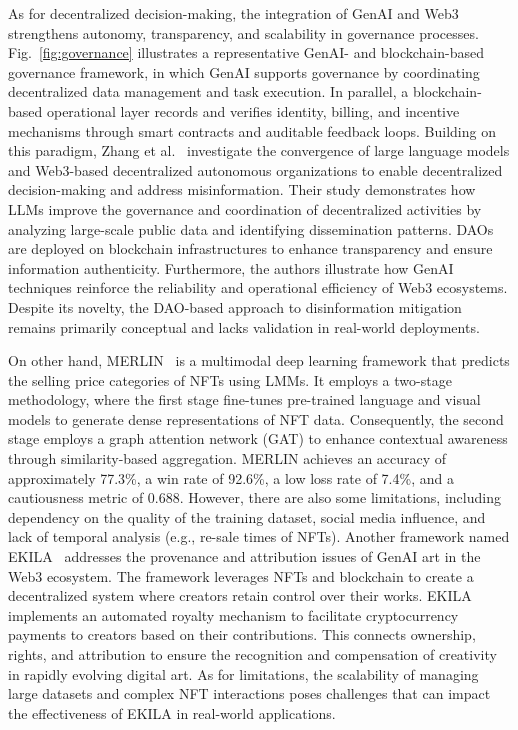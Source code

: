 \documentclass[5p,twocolumn]{elsarticle}
\begin{document}
As for decentralized decision-making, the integration of GenAI and Web3 strengthens autonomy, transparency, and scalability in governance processes. Fig.~\ref{fig:governance} illustrates a representative GenAI- and blockchain-based governance framework, in which GenAI supports governance by coordinating decentralized data management and task execution. In parallel, a blockchain-based operational layer records and verifies identity, billing, and incentive mechanisms through smart contracts and auditable feedback loops. Building on this paradigm, Zhang et al.~\cite{zhang2024decoding} investigate the convergence of large language models and Web3-based decentralized autonomous organizations to enable decentralized decision-making and address misinformation. Their study demonstrates how LLMs improve the governance and coordination of decentralized activities by analyzing large-scale public data and identifying dissemination patterns. DAOs are deployed on blockchain infrastructures to enhance transparency and ensure information authenticity. Furthermore, the authors illustrate how GenAI techniques reinforce the reliability and operational efficiency of Web3 ecosystems. Despite its novelty, the DAO-based approach to disinformation mitigation remains primarily conceptual and lacks validation in real-world deployments. 

On other hand, MERLIN~\cite{costa2023studying} is a multimodal deep learning framework that predicts the selling price categories of NFTs using LMMs. It employs a two-stage methodology, where the first stage fine-tunes pre-trained language and visual models to generate dense representations of NFT data. Consequently, the second stage employs a graph attention network (GAT) to enhance contextual awareness through similarity-based aggregation. MERLIN achieves an accuracy of approximately 77.3\%, a win rate of 92.6\%, a low loss rate of 7.4\%, and a cautiousness metric of 0.688. However, there are also some limitations, including dependency on the quality of the training dataset, social media influence, and lack of temporal analysis (e.g., re-sale times of NFTs). Another framework named EKILA~\cite{balan2023ekila} addresses the provenance and attribution issues of GenAI art in the Web3 ecosystem. The framework leverages NFTs and blockchain to create a decentralized system where creators retain control over their works. EKILA implements an automated royalty mechanism to facilitate cryptocurrency payments to creators based on their contributions. This connects ownership, rights, and attribution to ensure the recognition and compensation of creativity in rapidly evolving digital art. As for limitations, the scalability of managing large datasets and complex NFT interactions poses challenges that can impact the effectiveness of EKILA in real-world applications.
\end{document}
